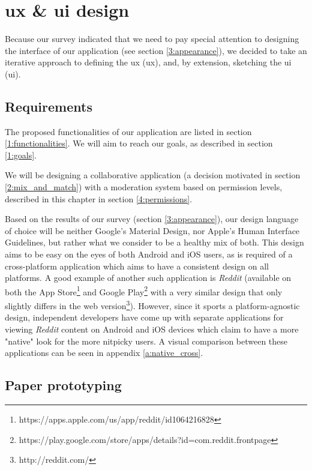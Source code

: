 \chapter{\acrshort{ux} \& \acrshort{ui} design} \label{chapter4}

Because our survey indicated that we need to pay special attention to designing the interface of our application (see section \ref{3:appearance}), we decided to take an iterative approach to defining the \acrlong{ux} (\acrshort{ux}), and, by extension, sketching the \acrlong{ui} (\acrshort{ui}).

\section{Requirements} \label{4:requirements}

The proposed functionalities of our application are listed in section \ref{1:functionalities}. We will aim to reach our goals, as described in section \ref{1:goals}.

We will be designing a collaborative application (a decision motivated in section \ref{2:mix_and_match}) with a moderation system based on permission levels, described in this chapter in section \ref{4:permissions}.

Based on the results of our survey (section \ref{3:appearance}), our design language of choice will be neither Google's Material Design\cite{google2020material}, nor Apple's Human Interface Guidelines\cite{apple2020human}, but rather what we consider to be a healthy mix of both. This design aims to be easy on the eyes of both Android and iOS users, as is required of a cross-platform application which aims to have a consistent design on all platforms. A good example of another such application is \textit{Reddit} (available on both the App Store\footnote{https://apps.apple.com/us/app/reddit/id1064216828} and Google Play\footnote{https://play.google.com/store/apps/details?id=com.reddit.frontpage} with a very similar design that only slightly differs in the web version\footnote{http://reddit.com/}). However, since it sports a platform-agnostic design, independent developers have come up with separate applications for viewing \textit{Reddit} content on Android and iOS devices which claim to have a more "native" look for the more nitpicky users. A visual comparison between these applications can be seen in appendix \ref{a:native_cross}.

\section{Paper prototyping} \label{4:paper}

